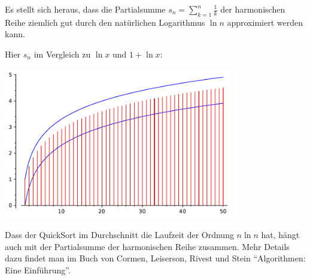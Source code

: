 \begin{bem}
	Es stellt sich heraus, dass die Partialsumme $s_n = \sum_{k=1}^n \frac{1}{k}$ der harmonischen Reihe ziemlich gut durch den natürlichen Logarithmus $\ln n$ approximiert werden kann. 
	
	Hier $s_n$ im Vergleich zu $\ln x$ und $1 + \ln x$: 
	
	\begin{center}
			\includegraphics[width=10cm]{pics/partial_sums_harmonic_series.pdf} 
	\end{center} 
	
	Dass der QuickSort im Durchschnitt die Laufzeit der Ordnung $n \ln n$ hat, hängt auch mit der Partialsumme der harmonischen Reihe zusammen. Mehr Details dazu findet man im Buch von Cormen, Leiserson, Rivest und Stein ``Algorithmen: Eine Einführung''. 
\end{bem} 


